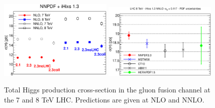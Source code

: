 \begin{figure}[ht]
\centering
\includegraphics[width=0.48\textwidth]{6-LHCimpact/figs/h.eps}
\includegraphics[width=0.48\textwidth]{6-LHCimpact/figs/h8-as0117.eps}
\caption[Predictions for the total Higgs production cross-section in the gluon fusion channel at the 7 and 8 TeV LHC]{Total Higgs production cross-section in the gluon fusion channel at the 7 and 8 TeV LHC. Predictions are given at NLO and NNLO.}
\label{fig:totalxsecHiggs}
\end{figure}




